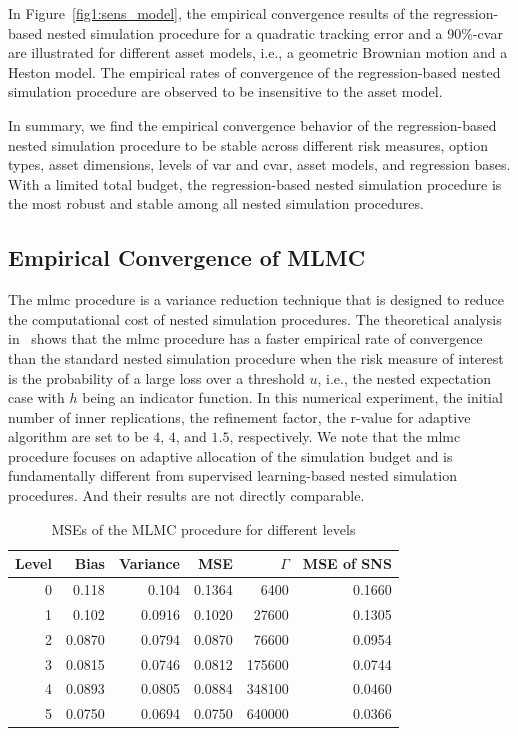 In Figure~\ref{fig1:sens_model}, the empirical convergence results of the regression-based nested simulation procedure for a quadratic tracking error and a 90\%-\gls{cvar} are illustrated for different asset models, i.e., a geometric Brownian motion and a Heston model.
The empirical rates of convergence of the regression-based nested simulation procedure are observed to be insensitive to the asset model.

In summary, we find the empirical convergence behavior of the regression-based nested simulation procedure to be stable across different risk measures, option types, asset dimensions, levels of \gls{var} and \gls{cvar}, asset models, and regression bases.
With a limited total budget, the regression-based nested simulation procedure is the most robust and stable among all nested simulation procedures. 

\subsection{Empirical Convergence of MLMC}\label{sec1:empirical-mlmc}

The \gls{mlmc} procedure is a variance reduction technique that is designed to reduce the computational cost of nested simulation procedures.
The theoretical analysis in~\cite{giles2019multilevel} shows that the \gls{mlmc} procedure has a faster empirical rate of convergence than the standard nested simulation procedure when the risk measure of interest is the probability of a large loss over a threshold $u$, i.e., the nested expectation case with $h$ being an indicator function.
In this numerical experiment, the initial number of inner replications, the refinement factor, the r-value for adaptive algorithm are set to be $4$, $4$, and $1.5$, respectively.
We note that the \gls{mlmc} procedure focuses on adaptive allocation of the simulation budget and is fundamentally different from supervised learning-based nested simulation procedures. And their results are not directly comparable.

\begin{table}[ht]
    \centering
    \begin{tabular}{rrrrrr}
    \toprule
    \textbf{Level} & \textbf{Bias} & \textbf{Variance} & \textbf{MSE} & $\Gamma$ & \textbf{MSE of SNS} \\ 
    \hline\hline
    0 & 0.118  & 0.104  & 0.1364 & 6400     & 0.1660    \\
    1 & 0.102  & 0.0916 & 0.1020 & 27600    & 0.1305    \\
    2 & 0.0870 & 0.0794 & 0.0870 & 76600    & 0.0954    \\
    3 & 0.0815 & 0.0746 & 0.0812 & 175600   & 0.0744    \\
    4 & 0.0893 & 0.0805 & 0.0884 & 348100   & 0.0460    \\
    5 & 0.0750 & 0.0694 & 0.0750 & 640000   & 0.0366    \\
    \bottomrule
    \end{tabular}
    \caption{MSEs of the MLMC procedure for different levels}
\label{tab1:mlmc-mse}
\end{table}

